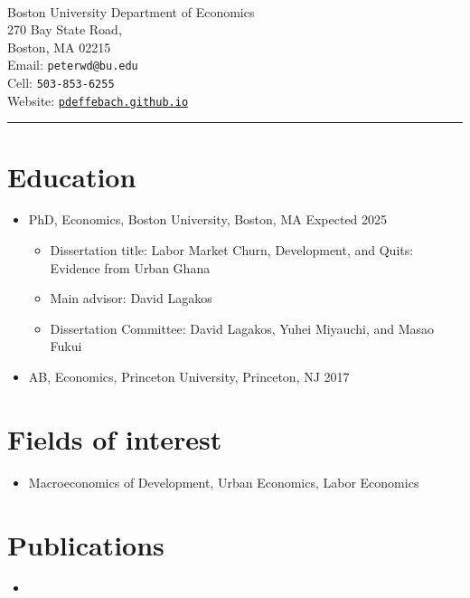 \documentclass[11pt]{article}
\newenvironment{customitemize}
{ \begin{itemize}[
	leftmargin=\parindent,
	itemindent=-0.5\parindent,
	topsep = 0pt, 
	itemsep = -1pt, 
	label={}] }
{\end{itemize} }
\begin{document}
\normalsize
\singlespacing

\thispagestyle{plain}


\newcommand{\link}[2]{{\color{blue}\href{#1}{#2}}}

 \\
Boston University Department of Economics \\
270 Bay State Road, \\
Boston, MA 02215 \\
Email: \texttt{peterwd@bu.edu} \\
Cell: \texttt{503-853-6255} \\
Website: \href{https://pdeffebach.github.io/}{\texttt{pdeffebach.github.io}} \\
\rule{\textwidth}{1pt}
\section*{Education}

\begin{customitemize}
\item PhD, Economics, Boston University, Boston, MA  \hfill Expected 2025 
\begin{customitemize}
\item Dissertation title: Labor Market Churn, Development, and Quits: Evidence from Urban Ghana 
\item Main advisor: David Lagakos 
\item Dissertation Committee: David Lagakos, Yuhei Miyauchi, and Masao Fukui 
\end{customitemize}
\item AB, Economics, Princeton University, Princeton, NJ  \hfill 2017
\end{customitemize}
\section*{Fields of interest}

\begin{customitemize}
\item Macroeconomics of Development, Urban Economics, Labor Economics
\end{customitemize}


\section*{Publications}

\begin{customitemize}
	\item {}
\end{customitemize}
\end{document}
